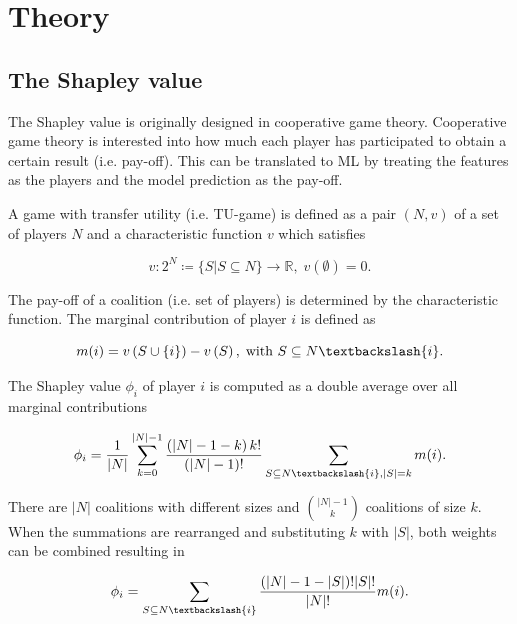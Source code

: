\documentclass[twoside,twocolumn,9pt]{article}
\begin{document}
\section{Theory}

\subsection{The Shapley value}

The Shapley value is originally designed in cooperative game theory.\cite{shapley1953value} Cooperative
game theory is interested into how much each player has participated to obtain a certain
result (i.e. pay-off).\cite{branzei2008models} This can be translated to ML by treating the features 
as the players and the model prediction as the pay-off.\cite{merrick2020explanation}

A game with transfer utility (i.e. TU-game) is defined as a pair $\left(N, v\right)$ of a set
of players $N$ and a characteristic function $v$ which satisfies\cite{branzei2008models}

\begin{equation}
	v: 2^N \coloneqq \{S | S \subseteq N\} \rightarrow \mathbb{R}, \; v\left(\emptyset\right) = 0.
\end{equation}

The pay-off of a coalition (i.e. set of players) is determined by the characteristic
function. The marginal contribution of player $i$ is defined as\cite{zhang2022gstarx}

\begin{equation}
	m(i) = v\left(S \cup \{i\}\right) - v\left(S\right), \; \text{with } S \subseteq N \textbackslash \{i\}.
\end{equation}

The Shapley value $\phi_i$ of player $i$ is computed as a double average over all marginal contributions\cite{zhang2022gstarx}

\begin{equation}
	\label{eq:Shapley}
        \phi_i  = \frac{1}{|N|} \sum_{k=0}^{|N|-1} \frac{\left(|N| - 1 - k\right)k!}{\left(|N| - 1\right)!} \sum_{S \subseteq N \textbackslash \{i\}, |S| = k} m(i). 
\end{equation}

There are $|N|$ coalitions with different sizes and ${|N| - 1 \choose k}$ coalitions of size $k$.
When the summations are rearranged and substituting $k$ with $|S|$, both weights can be combined 
resulting in 

\begin{equation}
	\phi_i = \sum_{S \subseteq N \textbackslash \{i\}} \frac{\left(|N| - 1 - |S| \right)!|S|!}{|N|!} m(i).
\end{equation}
\end{document}
